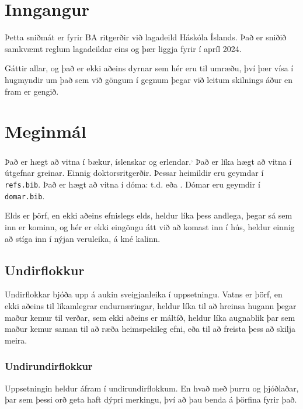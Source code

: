 \documentclass[a4paper, 12pt]{article}
\begin{document}
\maketitlepage %
\makesecondpage
\makethirdpage

\tableofcontents %
\thispagestyle{empty}
\newpage

\setcounter{page}{2}

\section{Inngangur}
Þetta sniðmát er fyrir BA ritgerðir við lagadeild Háskóla Íslands. Það er sniðið samkvæmt reglum lagadeildar eins og þær liggja fyrir í apríl 2024.

Gáttir allar, og það er ekki aðeins dyrnar sem hér eru til umræðu, því þær vísa í hugmyndir um það sem við göngum í gegnum þegar við leitum skilnings áður en fram er gengið.

\section{Meginmál}
Það er hægt að vitna í bækur, íslenskar og erlendar.\textsuperscript{,} Það er líka hægt að vitna í útgefnar greinar. Einnig doktorsritgerðir. Þessar heimildir eru geymdar í \texttt{refs.bib}.
Það er hægt að vitna í dóma: t.d. \textit{\cite{35-1981}} eða \textit{\cite{C-311/18}}. Dómar eru geymdir í \texttt{domar.bib}.

Elds er þörf, en ekki aðeins efnislegs elds, heldur líka þess andlega, þegar sá sem inn er kominn, og hér er ekki eingöngu átt við að komast inn í hús, heldur einnig að stíga inn í nýjan veruleika, á kné kalinn.

\subsection{Undirflokkur}
Undirflokkar bjóða upp á aukin sveigjanleika í uppsetningu.
Vatns er þörf, en ekki aðeins til líkamlegrar endurnæringar, heldur líka til að hreinsa hugann þegar maður kemur til verðar, sem ekki aðeins er máltíð, heldur líka augnablik þar sem maður kemur saman til að ræða heimspekileg efni, eða til að freista þess að skilja meira.


\subsubsection{Undirundirflokkur}
Uppsetningin heldur áfram í undirundirflokkum. En hvað með þurru og þjóðlaðar, þar sem þessi orð geta haft dýpri merkingu, því að þau benda á þörfina fyrir það.
\end{document}
